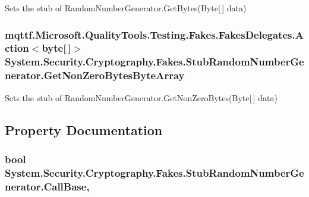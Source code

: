Sets the stub of Random\-Number\-Generator.\-Get\-Bytes(\-Byte\mbox{[}$\,$\mbox{]} data)

\hypertarget{class_system_1_1_security_1_1_cryptography_1_1_fakes_1_1_stub_random_number_generator_a61579c1645e41043b325888fea929864}{
\subsubsection[{Get\-Non\-Zero\-Bytes\-Byte\-Array}]{\setlength{\rightskip}{0pt plus 5cm}mqttf.\-Microsoft.\-Quality\-Tools.\-Testing.\-Fakes.\-Fakes\-Delegates.\-Action$<$byte\mbox{[}$\,$\mbox{]}$>$ System.\-Security.\-Cryptography.\-Fakes.\-Stub\-Random\-Number\-Generator.\-Get\-Non\-Zero\-Bytes\-Byte\-Array}}\label{class_system_1_1_security_1_1_cryptography_1_1_fakes_1_1_stub_random_number_generator_a61579c1645e41043b325888fea929864}


Sets the stub of Random\-Number\-Generator.\-Get\-Non\-Zero\-Bytes(\-Byte\mbox{[}$\,$\mbox{]} data)



\subsection{Property Documentation}
\hypertarget{class_system_1_1_security_1_1_cryptography_1_1_fakes_1_1_stub_random_number_generator_a07da80cb2820ba143aeae048f948f336}{
\subsubsection[{Call\-Base}]{\setlength{\rightskip}{0pt plus 5cm}bool System.\-Security.\-Cryptography.\-Fakes.\-Stub\-Random\-Number\-Generator.\-Call\-Base\hspace{0.3cm}{\ttfamily [get]}, {\ttfamily [set]}}}\label{class_system_1_1_security_1_1_cryptography_1_1_fakes_1_1_stub_random_number_generator_a07da80cb2820ba143aeae048f948f336}


